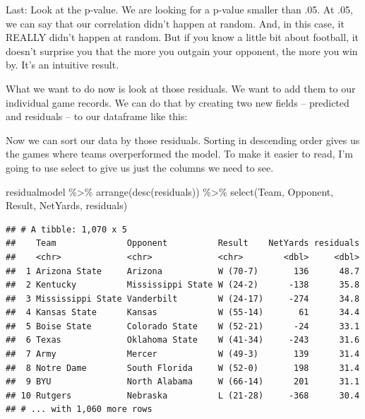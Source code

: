 \documentclass[
]{book}
\newenvironment{Shaded}{\begin{snugshade}}{\end{snugshade}}
\newcommand{\FunctionTok}[1]{\textcolor[rgb]{0.00,0.00,0.00}{#1}}
\newcommand{\NormalTok}[1]{#1}
\newcommand{\OtherTok}[1]{\textcolor[rgb]{0.56,0.35,0.01}{#1}}
\newcommand{\SpecialCharTok}[1]{\textcolor[rgb]{0.00,0.00,0.00}{#1}}
\begin{document}
Last: Look at the p-value. We are looking for a p-value smaller than .05. At .05, we can say that our correlation didn't happen at random. And, in this case, it REALLY didn't happen at random. But if you know a little bit about football, it doesn't surprise you that the more you outgain your opponent, the more you win by. It's an intuitive result.

What we want to do now is look at those residuals. We want to add them to our individual game records. We can do that by creating two new fields -- predicted and residuals -- to our dataframe like this:

\begin{Shaded}
\end{Shaded}

Now we can sort our data by those residuals. Sorting in descending order gives us the games where teams overperformed the model. To make it easier to read, I'm going to use select to give us just the columns we need to see.

\begin{Shaded}
\begin{Highlighting}[]
\NormalTok{residualmodel }\SpecialCharTok{\%\textgreater{}\%} \FunctionTok{arrange}\NormalTok{(}\FunctionTok{desc}\NormalTok{(residuals)) }\SpecialCharTok{\%\textgreater{}\%} \FunctionTok{select}\NormalTok{(Team, Opponent, Result, NetYards, residuals)}
\end{Highlighting}
\end{Shaded}

\begin{verbatim}
## # A tibble: 1,070 x 5
##    Team              Opponent          Result    NetYards residuals
##    <chr>             <chr>             <chr>        <dbl>     <dbl>
##  1 Arizona State     Arizona           W (70-7)       136      48.7
##  2 Kentucky          Mississippi State W (24-2)      -138      35.8
##  3 Mississippi State Vanderbilt        W (24-17)     -274      34.8
##  4 Kansas State      Kansas            W (55-14)       61      34.4
##  5 Boise State       Colorado State    W (52-21)      -24      33.1
##  6 Texas             Oklahoma State    W (41-34)     -243      31.6
##  7 Army              Mercer            W (49-3)       139      31.4
##  8 Notre Dame        South Florida     W (52-0)       198      31.4
##  9 BYU               North Alabama     W (66-14)      201      31.1
## 10 Rutgers           Nebraska          L (21-28)     -368      30.4
## # ... with 1,060 more rows
\end{verbatim}
\end{document}
